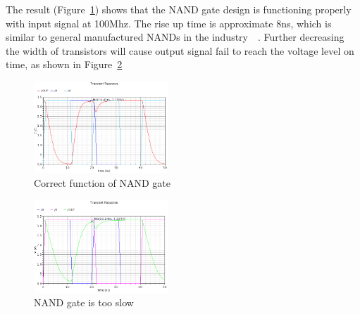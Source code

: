The result (Figure~\ref{fig:good}) shows that the NAND gate design is functioning properly with input signal at 100Mhz. The rise up time is approximate 8ns, which is similar to general manufactured NANDs in the industry~\cite{}~\cite{}. Further decreasing the width of transistors will cause output signal fail to reach the voltage level on time, as shown in Figure~\ref{fig:bad}

\begin{figure}[H]
		\centering
		\includegraphics[width = 0.45\textwidth]{Figures/good}		
		\caption{Correct function of NAND gate}
		\label {fig:good}
\end{figure}

\begin{figure}[H]
		\centering
		\includegraphics[width = 0.45\textwidth]{Figures/BAD}		
		\caption{NAND gate is too slow}
		\label {fig:bad}
\end{figure}